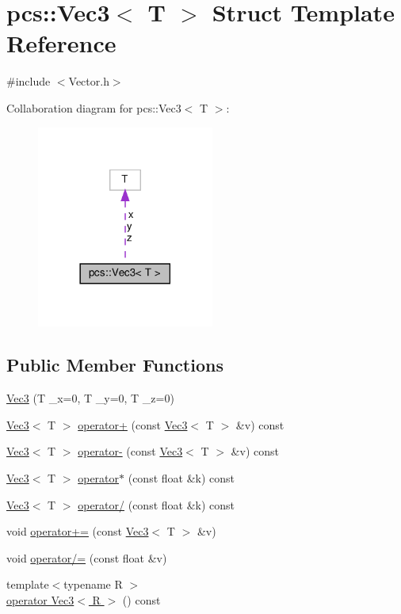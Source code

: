 \hypertarget{structpcs_1_1Vec3}{}\section{pcs\+:\+:Vec3$<$ T $>$ Struct Template Reference}
\label{structpcs_1_1Vec3}


{\ttfamily \#include $<$Vector.\+h$>$}



Collaboration diagram for pcs\+:\+:Vec3$<$ T $>$\+:\nopagebreak
\begin{figure}[H]
\begin{center}
\leavevmode
\includegraphics[width=165pt]{structpcs_1_1Vec3__coll__graph}
\end{center}
\end{figure}
\subsection*{Public Member Functions}
\begin{DoxyCompactItemize}
\item 
\hyperlink{structpcs_1_1Vec3_ae8bc40864aac5444a66d0b12fe0f3d03}{Vec3} (T \+\_\+x=0, T \+\_\+y=0, T \+\_\+z=0)
\item 
\hyperlink{structpcs_1_1Vec3}{Vec3}$<$ T $>$ \hyperlink{structpcs_1_1Vec3_a261591cf01248c3f9ad2524450394ac4}{operator+} (const \hyperlink{structpcs_1_1Vec3}{Vec3}$<$ T $>$ \&v) const
\item 
\hyperlink{structpcs_1_1Vec3}{Vec3}$<$ T $>$ \hyperlink{structpcs_1_1Vec3_ac2d21d671207753c0a8bd9d61324dbfa}{operator-\/} (const \hyperlink{structpcs_1_1Vec3}{Vec3}$<$ T $>$ \&v) const
\item 
\hyperlink{structpcs_1_1Vec3}{Vec3}$<$ T $>$ \hyperlink{structpcs_1_1Vec3_a1060574173402528a31c94a0554e4d10}{operator$\ast$} (const float \&k) const
\item 
\hyperlink{structpcs_1_1Vec3}{Vec3}$<$ T $>$ \hyperlink{structpcs_1_1Vec3_adbb6f4a7af41335fee654be780bff5e5}{operator/} (const float \&k) const
\item 
void \hyperlink{structpcs_1_1Vec3_ac9ea8184b784ce6324df893c304239f9}{operator+=} (const \hyperlink{structpcs_1_1Vec3}{Vec3}$<$ T $>$ \&v)
\item 
void \hyperlink{structpcs_1_1Vec3_ad76313f0957aea2abb06b5a70ad7d492}{operator/=} (const float \&v)
\item 
{\footnotesize template$<$typename R $>$ }\\\hyperlink{structpcs_1_1Vec3_ad42682971eb00c5cd4ec7309b85511ea}{operator Vec3$<$ R $>$} () const
\end{DoxyCompactItemize}
